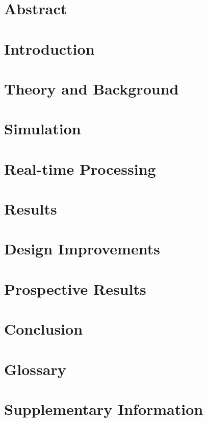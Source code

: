 \documentclass[a4paper, english, twoside, 12pt]{article}
\begin{document}
%

\thispagestyle{empty}

\pagebreak
\restoregeometry
{}

\listoftodos

\pagebreak

\glsunsetall
\tableofcontents
\pagebreak
\listoffigures
\glsresetall
\pagebreak

\section{Abstract}

\pagebreak
\section{Introduction}

\pagebreak
\section{Theory and Background}

\pagebreak
\section{Simulation}

\pagebreak
\section{Real-time Processing}

\pagebreak
\section{Results}

\pagebreak
\section{Design Improvements}

\pagebreak
\section{Prospective Results}

\pagebreak
\section{Conclusion}

\pagebreak


\pagebreak
\begin{appendices} 
	\section{Glossary}
	\printglossaries
	\section{Supplementary Information}
	
\end{appendices}
\end{document}
